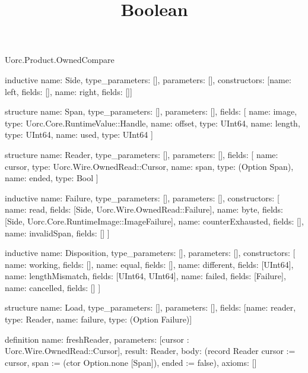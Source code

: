 \begin{lexlean}{Uorc.Product.OwnedCompare}
\title{Boolean}
\begin{semanticmodule}
inductive{
  name: Side,
  type_parameters: [],
  parameters: [],
  constructors: [{name: left, fields: []}, {name: right, fields: []}]
}

structure{
  name: Span,
  type_parameters: [],
  parameters: [],
  fields: [
    {name: image, type: Uorc.Core.RuntimeValue::Handle},
    {name: offset, type: UInt64},
    {name: length, type: UInt64},
    {name: used, type: UInt64}
  ]
}

structure{
  name: Reader,
  type_parameters: [],
  parameters: [],
  fields: [
    {name: cursor, type: Uorc.Wire.OwnedRead::Cursor},
    {name: span, type: (Option Span)},
    {name: ended, type: Bool}
  ]
}

inductive{
  name: Failure,
  type_parameters: [],
  parameters: [],
  constructors: [
    {name: read, fields: [Side, Uorc.Wire.OwnedRead::Failure]},
    {name: byte, fields: [Side, Uorc.Core.RuntimeImage::ImageFailure]},
    {name: counterExhausted, fields: []},
    {name: invalidSpan, fields: []}
  ]
}

inductive{
  name: Disposition,
  type_parameters: [],
  parameters: [],
  constructors: [
    {name: working, fields: []},
    {name: equal, fields: []},
    {name: different, fields: [UInt64]},
    {name: lengthMismatch, fields: [UInt64, UInt64]},
    {name: failed, fields: [Failure]},
    {name: cancelled, fields: []}
  ]
}

structure{
  name: Load,
  type_parameters: [],
  parameters: [],
  fields: [{name: reader, type: Reader}, {name: failure, type: (Option Failure)}]
}

definition{
  name: freshReader,
  parameters: [cursor : Uorc.Wire.OwnedRead::Cursor],
  result: Reader,
  body: (record Reader {cursor := cursor, span := (ctor Option.none [Span]), ended := false}),
  axioms: []
}


\end{semanticmodule}
\end{lexlean}
